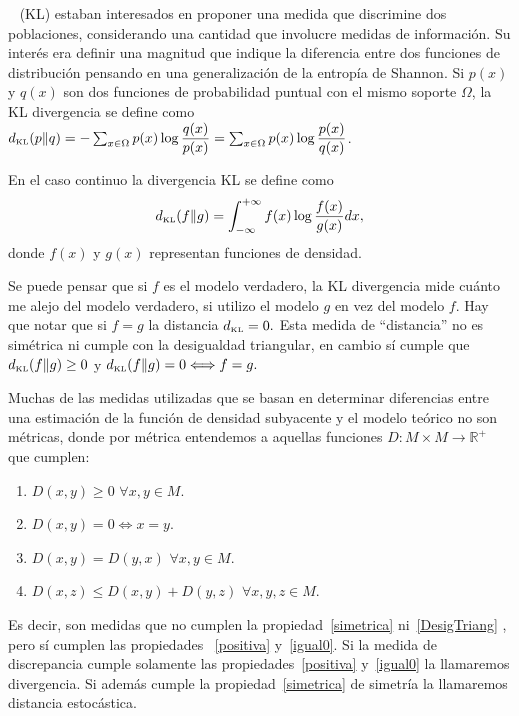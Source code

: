 ~\citet{KullbackLeibler1951} (KL) estaban interesados en proponer una medida que discrimine dos poblaciones, considerando una cantidad que involucre medidas de informaci\'on. Su inter\'es era definir una magnitud que indique la diferencia entre dos funciones de distribuci\'on pensando en una generalizaci\'on de la entrop\'ia de Shannon. Si $p(x)$ y $q(x)$ son dos funciones de probabilidad puntual con el mismo soporte $\Omega$, la KL divergencia se define como $d_{\text{\tiny{KL}}}(p \rVert q)=-\sum_{x \in \Omega} p(x) \log \dfrac{q(x)}{p(x)}=\sum_{x \in \Omega} p(x) \log\dfrac{p(x)}{q(x)}$. 

En el caso continuo la divergencia KL se define como 
\begin{align}
\label{KL}
d_{\text{\tiny{KL}}}(f \rVert g)=\int_{-\infty}^{+\infty} f(x) \log\dfrac{f(x)}{g(x)} dx,
\end{align} 
donde $f(x)$ y $g(x)$ representan funciones de densidad. 

Se puede pensar que si $f$ es el modelo verdadero, la KL divergencia mide cu\'anto me alejo del modelo verdadero, si utilizo el modelo $g$ en vez del modelo $f$. Hay que notar que si $f=g$ la distancia $d_\text{\tiny{KL}}=0.$ Esta medida de ``distancia'' no es sim\'etrica ni cumple con la desigualdad triangular,  en cambio s\'i cumple que $d_{\text{\tiny{KL}}}(f \rVert g)\geq 0$ y $d_{\text{\tiny{KL}}}(f \rVert g)= 0 \Longleftrightarrow f=g.$ 

Muchas de las medidas utilizadas que se basan en determinar diferencias entre una estimación de la función de densidad subyacente y el modelo teórico no son métricas, donde por métrica entendemos a aquellas funciones $D:M \times M\rightarrow \mathbb{R}^+$ que cumplen:

\begin{enumerate}
	\label{metrica}
	\item \label{positiva}$D(x,y)\geq 0$ $\forall x,y \in M$.
	\item \label{igual0}$D(x,y)= 0 \Leftrightarrow x=y$.
	\item \label{simetrica}$D(x,y)=D(y,x)$  $\forall x,y \in M$.
	\item \label{DesigTriang}$D(x,z)\leq D(x,y)+D(y,z)$  $\forall x,y,z \in M$.
\end{enumerate} 

Es decir, son medidas que no cumplen la propiedad~\ref{simetrica} ni~\ref{DesigTriang} , pero sí cumplen las propiedades ~\ref{positiva} y~\ref{igual0}. Si la medida de discrepancia cumple solamente las propiedades~\ref{positiva} y~\ref{igual0} la llamaremos divergencia. Si además cumple la propiedad~\ref{simetrica} de simetría la llamaremos distancia estocástica. 

